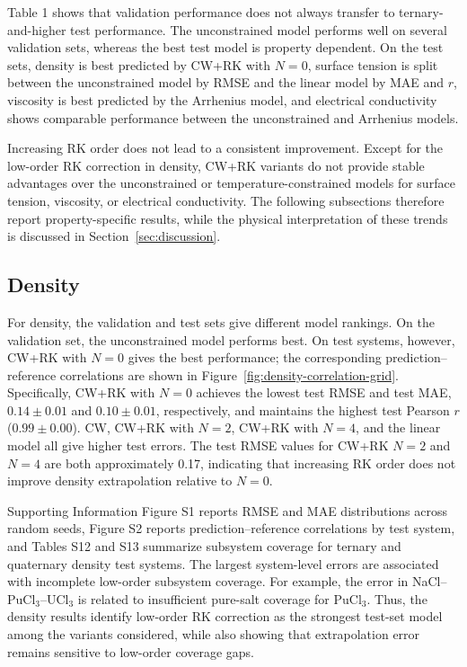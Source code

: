 \documentclass[journal=jctcce,manuscript=article,doi=true]{achemso}
\begin{document}
Table 1 shows that validation performance does not always transfer to ternary-and-higher test performance. The unconstrained model performs well on several validation sets, whereas the best test model is property dependent. On the test sets, density is best predicted by CW+RK with \(N=0\), surface tension is split between the unconstrained model by RMSE and the linear model by MAE and \(r\), viscosity is best predicted by the Arrhenius model, and electrical conductivity shows comparable performance between the unconstrained and Arrhenius models.

Increasing RK order does not lead to a consistent improvement. Except for the low-order RK correction in density, CW+RK variants do not provide stable advantages over the unconstrained or temperature-constrained models for surface tension, viscosity, or electrical conductivity. The following subsections therefore report property-specific results, while the physical interpretation of these trends is discussed in Section~\ref{sec:discussion}.

\subsection{Density}\label{sec:density}

For density, the validation and test sets give different model rankings. On the validation set, the unconstrained model performs best. On test systems, however, CW+RK with \(N=0\) gives the best performance; the corresponding prediction--reference correlations are shown in Figure~\ref{fig:density-correlation-grid}. Specifically, CW+RK with \(N=0\) achieves the lowest test RMSE and test MAE, \(0.14 \pm 0.01\) and \(0.10 \pm 0.01\), respectively, and maintains the highest test Pearson \(r\) (\(0.99 \pm 0.00\)). CW, CW+RK with \(N=2\), CW+RK with \(N=4\), and the linear model all give higher test errors. The test RMSE values for CW+RK \(N=2\) and \(N=4\) are both approximately 0.17, indicating that increasing RK order does not improve density extrapolation relative to \(N=0\).

Supporting Information Figure S1 reports RMSE and MAE distributions across random seeds, Figure S2 reports prediction--reference correlations by test system, and Tables S12 and S13 summarize subsystem coverage for ternary and quaternary density test systems. The largest system-level errors are associated with incomplete low-order subsystem coverage. For example, the error in NaCl--PuCl\(_3\)--UCl\(_3\) is related to insufficient pure-salt coverage for PuCl\(_3\). Thus, the density results identify low-order RK correction as the strongest test-set model among the variants considered, while also showing that extrapolation error remains sensitive to low-order coverage gaps.
\end{document}

